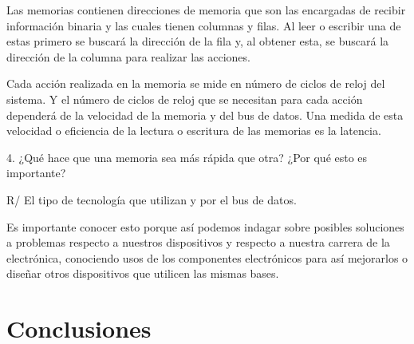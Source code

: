 \documentclass{article}
\begin{document}
Las memorias contienen direcciones de memoria que son las encargadas de recibir información binaria y las cuales tienen columnas y filas. Al leer o escribir una de estas primero se buscará la dirección de la fila y, al obtener esta, se buscará la dirección de la columna para realizar las acciones.

Cada acción realizada en la memoria se mide en número de ciclos de reloj del sistema. Y el número de ciclos de reloj que se necesitan para cada acción dependerá de la velocidad de la memoria y del bus de datos. Una medida de esta velocidad o eficiencia de la lectura o escritura de las memorias es la latencia.


\vspace{1.0cm}
4. ¿Qué hace que una memoria sea más rápida que otra? ¿Por qué esto es importante?

\vspace{0.3cm}
R/ El tipo de tecnología que utilizan y por el bus de datos.

Es importante conocer esto porque así podemos indagar sobre posibles soluciones a problemas respecto a nuestros dispositivos  y respecto a nuestra carrera de la electrónica, conociendo usos de los componentes electrónicos para así mejorarlos o diseñar otros dispositivos que utilicen las mismas bases.

\vspace{0.5cm}

\section{Conclusiones} \label{conclulsion}
\end{document}
